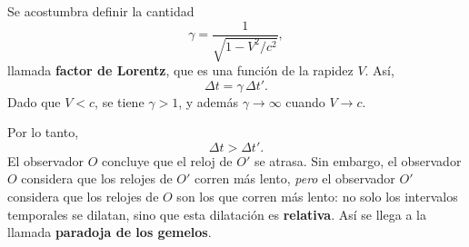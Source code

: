 Se acostumbra definir la cantidad
\[
\gamma = \frac{1}{\sqrt{1-V^2/c^2}}, \tag{21}
\]
llamada \textbf{factor de Lorentz}, que es una función de la rapidez
$V$. Así,
\[
\Delta t = \gamma\,\Delta t' . \tag{22}
\]
Dado que $V<c$, se tiene $\gamma>1$, y además $\gamma\to\infty$ cuando
$V\to c$.

\begin{center}
\end{center}

Por lo tanto,
\[
\Delta t>\Delta t' . \tag{23}
\]
El observador $O$ concluye que el reloj de $O'$ se atrasa. Sin embargo,
el observador $O$ considera que los relojes de $O'$ corren más lento,
\emph{pero} el observador $O'$ considera que los relojes de $O$ son los
que corren más lento: no solo los intervalos temporales se dilatan, sino
que esta dilatación es \textbf{relativa}. Así se llega a la llamada
\textbf{paradoja de los gemelos}.


